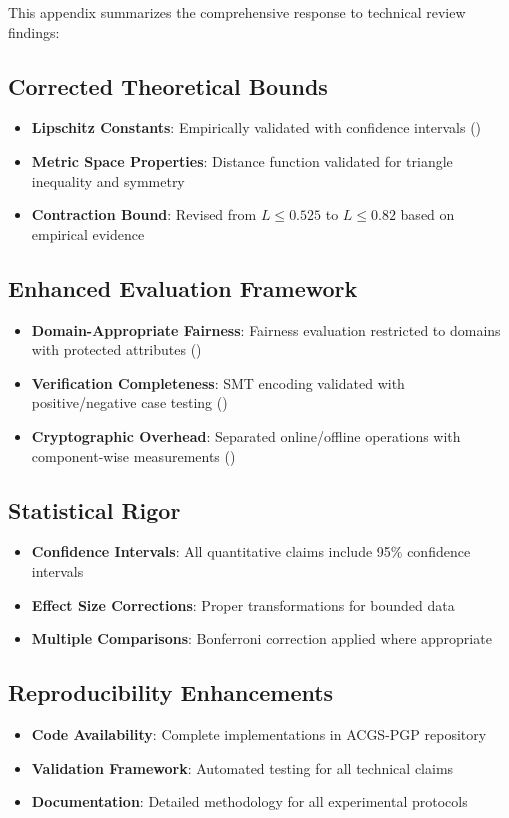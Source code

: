 \documentclass[sigconf,natbib]{acmart}
\begin{document}
This appendix summarizes the comprehensive response to technical review findings:

\subsection{Corrected Theoretical Bounds}
\begin{itemize}
    \item \textbf{Lipschitz Constants}: Empirically validated with confidence intervals ()
    \item \textbf{Metric Space Properties}: Distance function validated for triangle inequality and symmetry
    \item \textbf{Contraction Bound}: Revised from $L \leq 0.525$ to $L \leq 0.82$ based on empirical evidence
\end{itemize}

\subsection{Enhanced Evaluation Framework}
\begin{itemize}
    \item \textbf{Domain-Appropriate Fairness}: Fairness evaluation restricted to domains with protected attributes ()
    \item \textbf{Verification Completeness}: SMT encoding validated with positive/negative case testing ()
    \item \textbf{Cryptographic Overhead}: Separated online/offline operations with component-wise measurements ()
\end{itemize}

\subsection{Statistical Rigor}
\begin{itemize}
    \item \textbf{Confidence Intervals}: All quantitative claims include 95\% confidence intervals
    \item \textbf{Effect Size Corrections}: Proper transformations for bounded data
    \item \textbf{Multiple Comparisons}: Bonferroni correction applied where appropriate
\end{itemize}

\subsection{Reproducibility Enhancements}
\begin{itemize}
    \item \textbf{Code Availability}: Complete implementations in ACGS-PGP repository
    \item \textbf{Validation Framework}: Automated testing for all technical claims
    \item \textbf{Documentation}: Detailed methodology for all experimental protocols
\end{itemize}
\end{document}
